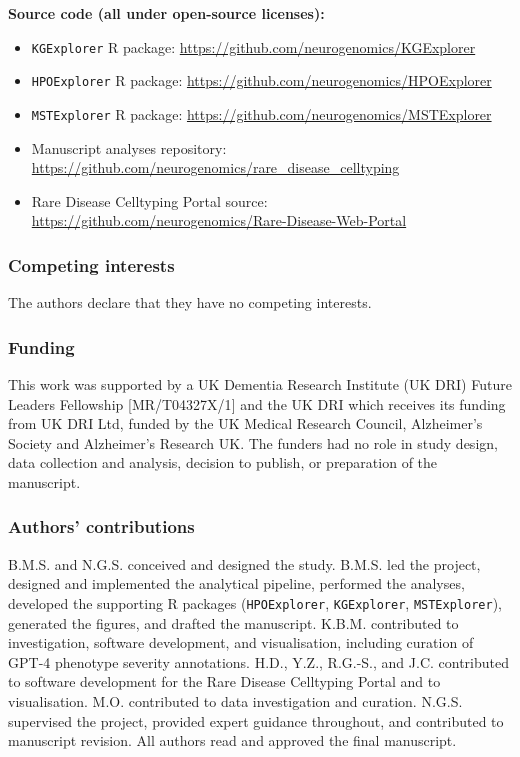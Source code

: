 \documentclass[
]{article}
\providecommand{\tightlist}{%
  \setlength{\itemsep}{0pt}\setlength{\parskip}{0pt}}
\begin{document}
\textbf{Source code (all under open-source licenses):}

\begin{itemize}
\tightlist
\item
  \texttt{KGExplorer} R package:
  \url{https://github.com/neurogenomics/KGExplorer}
\item
  \texttt{HPOExplorer} R package:
  \url{https://github.com/neurogenomics/HPOExplorer}
\item
  \texttt{MSTExplorer} R package:
  \url{https://github.com/neurogenomics/MSTExplorer}
\item
  Manuscript analyses repository:
  \url{https://github.com/neurogenomics/rare_disease_celltyping}
\item
  Rare Disease Celltyping Portal source:
  \url{https://github.com/neurogenomics/Rare-Disease-Web-Portal}
\end{itemize}

\subsubsection{Competing interests}\label{competing-interests}

The authors declare that they have no competing interests.

\subsubsection{Funding}\label{funding}

This work was supported by a UK Dementia Research Institute (UK DRI)
Future Leaders Fellowship {[}MR/T04327X/1{]} and the UK DRI which
receives its funding from UK DRI Ltd, funded by the UK Medical Research
Council, Alzheimer's Society and Alzheimer's Research UK. The funders
had no role in study design, data collection and analysis, decision to
publish, or preparation of the manuscript.

\subsubsection{Authors' contributions}\label{authors-contributions}

B.M.S. and N.G.S. conceived and designed the study. B.M.S. led the
project, designed and implemented the analytical pipeline, performed the
analyses, developed the supporting R packages (\texttt{HPOExplorer},
\texttt{KGExplorer}, \texttt{MSTExplorer}), generated the figures, and
drafted the manuscript. K.B.M. contributed to investigation, software
development, and visualisation, including curation of GPT-4 phenotype
severity annotations. H.D., Y.Z., R.G.-S., and J.C. contributed to
software development for the Rare Disease Celltyping Portal and to
visualisation. M.O. contributed to data investigation and curation.
N.G.S. supervised the project, provided expert guidance throughout, and
contributed to manuscript revision. All authors read and approved the
final manuscript.
\end{document}
